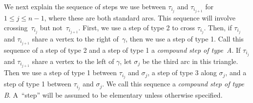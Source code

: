 \documentclass[11pt]{article}
\numberwithin{equation}{section}
\begin{document}
We next explain the sequence of steps we use between $\tau_{i_j}$ and $\tau_{i_{j+1}}$ for $1 \leq j \leq n-1$, where these are both standard arcs. This sequence will involve crossing~$\tau_{i_j}$ but not~$\tau_{i_{j+1}}$. First, we use a step of type 2 to cross $\tau_{i_j}$. Then, if $\tau_{i_j}$ and $\tau_{i_{j+1}}$ share a vertex to the right of~$\gamma$, then we use a step of type 1. Call this sequence of a step of type 2 and a step of type 1 a \emph{compound step of type~A}. If $\tau_{i_j}$ and $\tau_{i_{j+1}}$ share a vertex to the left of $\gamma$, let $\sigma_j$ be the third arc in this triangle. Then we use a step of type 1 between $\tau_{i_j}$ and $\sigma_j$, a step of type 3 along $\sigma_j$, and a step of type 1 between $\tau_{i_j}$ and $\sigma_j$. We call this sequence a \emph{compound step of type B}. A~``step'' will be assumed to be elementary unless otherwise specified.
\end{document}
